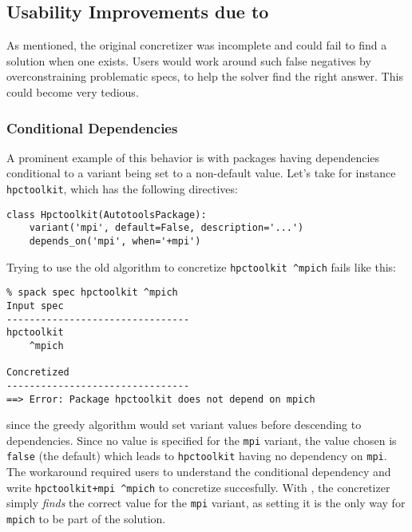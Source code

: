 \subsection{Usability Improvements due to \clingo}
As mentioned, the original concretizer was incomplete and could fail to find a solution
when one exists. Users would work around such false negatives by overconstraining
problematic specs, to help the solver find the right answer. This could become very
tedious.


\subsubsection{Conditional Dependencies}
A prominent example of this behavior is with packages having dependencies conditional to a variant being set to a non-default value. Let's take for instance {\tt hpctoolkit}, which has the following directives:

\begin{verbatim}
class Hpctoolkit(AutotoolsPackage):
    variant('mpi', default=False, description='...')
    depends_on('mpi', when='+mpi')
\end{verbatim}

Trying to use the old algorithm to concretize {\tt hpctoolkit \^{}mpich} fails like this:

\begin{verbatim}
% spack spec hpctoolkit ^mpich
Input spec
--------------------------------
hpctoolkit
    ^mpich

Concretized
--------------------------------
==> Error: Package hpctoolkit does not depend on mpich
\end{verbatim}
%
since the greedy algorithm would set variant values before descending to dependencies.
Since no value is specified for the {\tt mpi} variant, the value chosen is
{\tt false} (the default) which leads to {\tt hpctoolkit} having no dependency on
{\tt mpi}. The workaround required users to understand the conditional dependency and
write {\tt hpctoolkit+mpi \^{}mpich} to concretize succesfully. With \clingo{}, the
concretizer simply {\it finds} the correct value for the {\tt mpi} variant, as
setting it is the only way for {\tt mpich} to be part of the solution.

